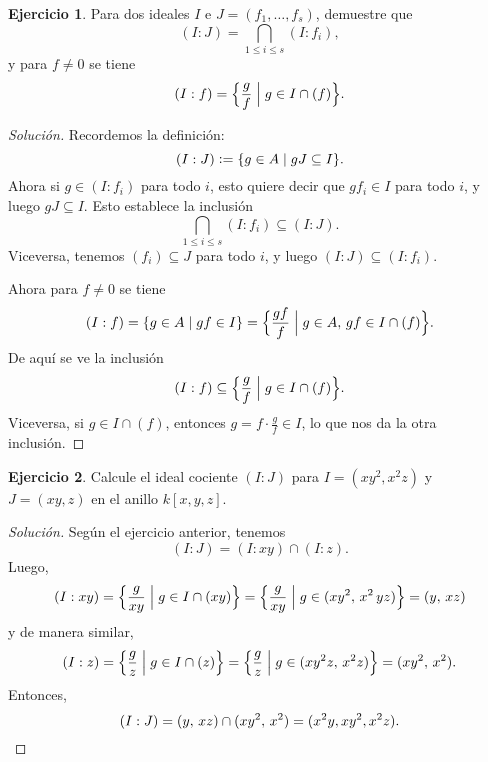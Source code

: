 \documentclass{article}
\theoremstyle{definition}
\newtheorem{ejerc}{Ejercicio}
\newenvironment{solucion}{\begin{proof}[Solución]}{\end{proof}}
\begin{document}
\begin{ejerc}
  Para dos ideales $I$ e $J = (f_1, \ldots, f_s)$, demuestre que
  $$(I : J) = \bigcap_{1 \le i \le s} (I : f_i),$$
  y para $f \ne 0$ se tiene
  $$(I : f) = \Bigl\{ \frac{g}{f} \Bigm| g \in I \cap (f) \Bigr\}.$$

  \ifdefined\solutions\begin{solucion}
    Recordemos la definición:
    $$(I : J) \mathrel{\mathop:}= \{ g \in A \mid gJ \subseteq I \}.$$
    Ahora si $g \in (I : f_i)$ para todo $i$, esto quiere decir que $gf_i \in I$
    para todo $i$, y luego $gJ \subseteq I$. Esto establece la inclusión
    $$\bigcap_{1 \le i \le s} (I : f_i) \subseteq (I : J).$$
    Viceversa, tenemos $(f_i) \subseteq J$ para todo $i$, y luego
    $(I : J) \subseteq (I : f_i)$.

    Ahora para $f \ne 0$ se tiene
    \[ (I : f) = \{ g \in A \mid gf \in I \} =
       \Bigl\{ \frac{gf}{f} \Bigm| g \in A, \, gf \in I \cap (f) \Bigr\}. \]
    De aquí se ve la inclusión
    $$(I : f) \subseteq \Bigl\{ \frac{g}{f} \Bigm| g \in I \cap (f) \Bigr\}.$$
    Viceversa, si $g \in I \cap (f)$, entonces $g = f\cdot \frac{g}{f} \in I$,
    lo que nos da la otra inclusión.
  \end{solucion}\fi
\end{ejerc}

\begin{ejerc}
  Calcule el ideal cociente $(I : J)$ para $I = (xy^2, x^2z)$ y $J = (xy,z)$ en
  el anillo $k [x,y,z]$.

  \ifdefined\solutions\begin{solucion}
    Según el ejercicio anterior, tenemos
    $$(I : J) = (I : xy) \cap (I : z).$$
    Luego,
    \[ (I : xy) =
       \Bigl\{ \frac{g}{xy} \Bigm| g \in I \cap (xy) \Bigr\} =
       \Bigl\{ \frac{g}{xy} \Bigm| g \in (xy^2, \, x^2\,yz) \Bigr\} =
       (y, \, xz) \]
    y de manera similar,
    \[ (I : z) =
       \Bigl\{ \frac{g}{z} \Bigm| g \in I \cap (z) \Bigr\} =
       \Bigl\{ \frac{g}{z} \Bigm| g \in (xy^2z, \, x^2z) \Bigr\} =
       (xy^2, \, x^2). \]
    Entonces,
    \[ (I : J) = (y, \, xz) \cap (xy^2, \, x^2) = (x^2y, xy^2, x^2z). \qedhere \]
  \end{solucion}\fi
\end{ejerc}
\end{document}
